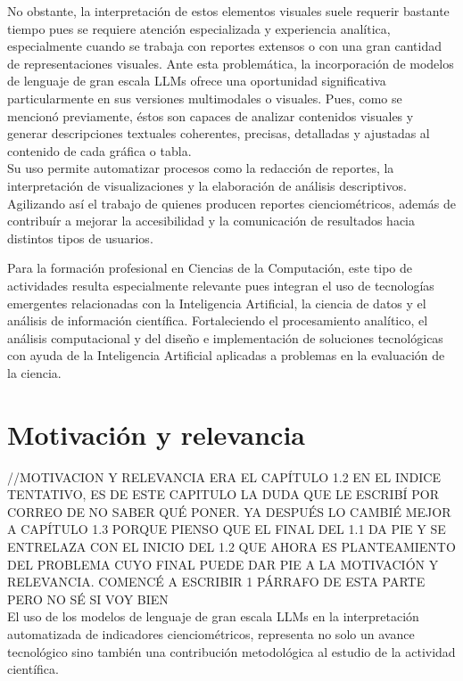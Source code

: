 \documentclass[letterpaper,spanish,12pt]{book}
\begin{document}
    \noindent No obstante, la interpretación de estos elementos visuales suele requerir bastante tiempo pues se requiere atención especializada y experiencia analítica, especialmente cuando se trabaja con reportes extensos o con una gran cantidad de representaciones visuales. Ante esta problemática, la incorporación de modelos de lenguaje de gran escala LLMs ofrece una oportunidad significativa particularmente en sus versiones multimodales o visuales. Pues, como se mencionó previamente, éstos son capaces de analizar contenidos visuales y generar descripciones textuales coherentes, precisas, detalladas y ajustadas al contenido de cada gráfica o tabla. \\
    
    \noindent Su uso permite automatizar procesos como la redacción de reportes, la interpretación de visualizaciones y la elaboración de análisis descriptivos. Agilizando así el trabajo de quienes producen reportes cienciométricos, además de contribuír a mejorar la accesibilidad y la comunicación de resultados hacia distintos tipos de usuarios.

    \noindent Para la formación profesional en Ciencias de la Computación, este tipo de actividades resulta especialmente relevante pues integran el uso de tecnologías emergentes relacionadas con la Inteligencia Artificial, la ciencia de datos y el análisis de información científica. Fortaleciendo el procesamiento analítico, el análisis computacional y del diseño e implementación de soluciones tecnológicas con ayuda de la Inteligencia Artificial aplicadas a problemas en la evaluación de la ciencia.

    \section{Motivación y relevancia} //MOTIVACION Y RELEVANCIA ERA EL CAPÍTULO 1.2 EN EL INDICE TENTATIVO, ES DE ESTE CAPITULO LA DUDA QUE LE ESCRIBÍ POR CORREO DE NO SABER QUÉ PONER. YA DESPUÉS LO CAMBIÉ MEJOR A CAPÍTULO 1.3 PORQUE PIENSO QUE EL FINAL DEL 1.1 DA PIE Y SE ENTRELAZA CON EL INICIO DEL 1.2 QUE AHORA ES PLANTEAMIENTO DEL PROBLEMA CUYO FINAL PUEDE DAR PIE A LA MOTIVACIÓN Y RELEVANCIA. COMENCÉ A ESCRIBIR 1 PÁRRAFO DE ESTA PARTE PERO NO SÉ SI VOY BIEN \\

    El uso de los modelos de lenguaje de gran escala LLMs en la interpretación automatizada de indicadores cienciométricos, representa no solo un avance tecnológico sino también una contribución metodológica al estudio de la actividad científica.
\end{document}
